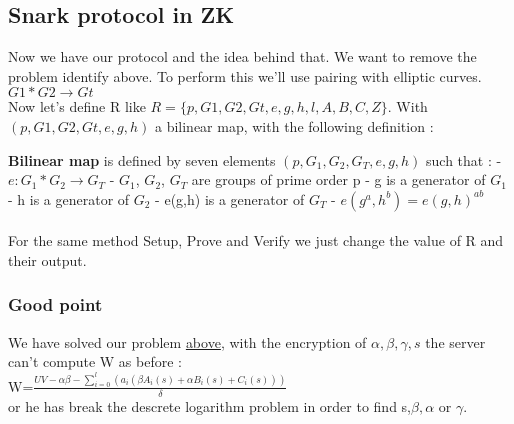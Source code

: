 \newpage
\subsection{Snark protocol in ZK}
Now we have our protocol and the idea behind that. We want to remove the problem identify above. To perform this we'll use pairing with elliptic curves. $G1*G2 \rightarrow Gt$
\\Now let's define R like $R = \{p, G1, G2, Gt, e, g, h, l, A, B, C, Z\}$. With $(p, G1, G2, Gt, e, g, h)$ a bilinear map, with the following definition :

\textbf{Bilinear map} is defined by seven elements $(p, G_1, G_2, G_T, e, g, h)$ such that :
\tabNormal - $e:G_1*G_2\rightarrow G_T$
\tabNormal - $G_1$, $G_2$, $G_T$ are groups of prime order p
\tabNormal - g is a generator of $G_1$
\tabNormal - h is a generator of $G_2$
\tabNormal - e(g,h) is a generator of $G_T$
\tabNormal - $e(g^a, h^b) = e(g,h)^{ab}$ \\
\\For the same method Setup, Prove and Verify we just change the value of R and their output.









\subsubsection{Good point}
We have solved our problem \hyperref[sec:ProblemWithoutZK]{above}, with the encryption of $\alpha, \beta,\gamma,s$ the server can't compute W as before :
\\W=$\frac{UV-\alpha\beta-\sum_{i=0}^l(a_i(\beta A_i(s) + \alpha B_i(s) + C_i(s)))}{\delta}$
\\
or he has break the descrete logarithm problem in order to find s,$\beta, \alpha$ or $\gamma$.